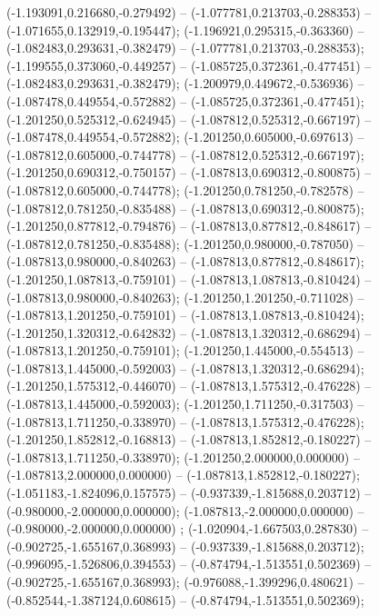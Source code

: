  (-1.193091,0.216680,-0.279492) -- (-1.077781,0.213703,-0.288353) -- (-1.071655,0.132919,-0.195447);
 (-1.196921,0.295315,-0.363360) -- (-1.082483,0.293631,-0.382479) -- (-1.077781,0.213703,-0.288353);
 (-1.199555,0.373060,-0.449257) -- (-1.085725,0.372361,-0.477451) -- (-1.082483,0.293631,-0.382479);
 (-1.200979,0.449672,-0.536936) -- (-1.087478,0.449554,-0.572882) -- (-1.085725,0.372361,-0.477451);
 (-1.201250,0.525312,-0.624945) -- (-1.087812,0.525312,-0.667197) -- (-1.087478,0.449554,-0.572882);
 (-1.201250,0.605000,-0.697613) -- (-1.087812,0.605000,-0.744778) -- (-1.087812,0.525312,-0.667197);
 (-1.201250,0.690312,-0.750157) -- (-1.087813,0.690312,-0.800875) -- (-1.087812,0.605000,-0.744778);
 (-1.201250,0.781250,-0.782578) -- (-1.087812,0.781250,-0.835488) -- (-1.087813,0.690312,-0.800875);
 (-1.201250,0.877812,-0.794876) -- (-1.087813,0.877812,-0.848617) -- (-1.087812,0.781250,-0.835488);
 (-1.201250,0.980000,-0.787050) -- (-1.087813,0.980000,-0.840263) -- (-1.087813,0.877812,-0.848617);
 (-1.201250,1.087813,-0.759101) -- (-1.087813,1.087813,-0.810424) -- (-1.087813,0.980000,-0.840263);
 (-1.201250,1.201250,-0.711028) -- (-1.087813,1.201250,-0.759101) -- (-1.087813,1.087813,-0.810424);
 (-1.201250,1.320312,-0.642832) -- (-1.087813,1.320312,-0.686294) -- (-1.087813,1.201250,-0.759101);
 (-1.201250,1.445000,-0.554513) -- (-1.087813,1.445000,-0.592003) -- (-1.087813,1.320312,-0.686294);
 (-1.201250,1.575312,-0.446070) -- (-1.087813,1.575312,-0.476228) -- (-1.087813,1.445000,-0.592003);
 (-1.201250,1.711250,-0.317503) -- (-1.087813,1.711250,-0.338970) -- (-1.087813,1.575312,-0.476228);
 (-1.201250,1.852812,-0.168813) -- (-1.087813,1.852812,-0.180227) -- (-1.087813,1.711250,-0.338970);
 (-1.201250,2.000000,0.000000) -- (-1.087813,2.000000,0.000000) -- (-1.087813,1.852812,-0.180227);
 (-1.051183,-1.824096,0.157575) -- (-0.937339,-1.815688,0.203712) -- (-0.980000,-2.000000,0.000000);
 (-1.087813,-2.000000,0.000000) -- (-0.980000,-2.000000,0.000000) ;
 (-1.020904,-1.667503,0.287830) -- (-0.902725,-1.655167,0.368993) -- (-0.937339,-1.815688,0.203712);
 (-0.996095,-1.526806,0.394553) -- (-0.874794,-1.513551,0.502369) -- (-0.902725,-1.655167,0.368993);
 (-0.976088,-1.399296,0.480621) -- (-0.852544,-1.387124,0.608615) -- (-0.874794,-1.513551,0.502369);
